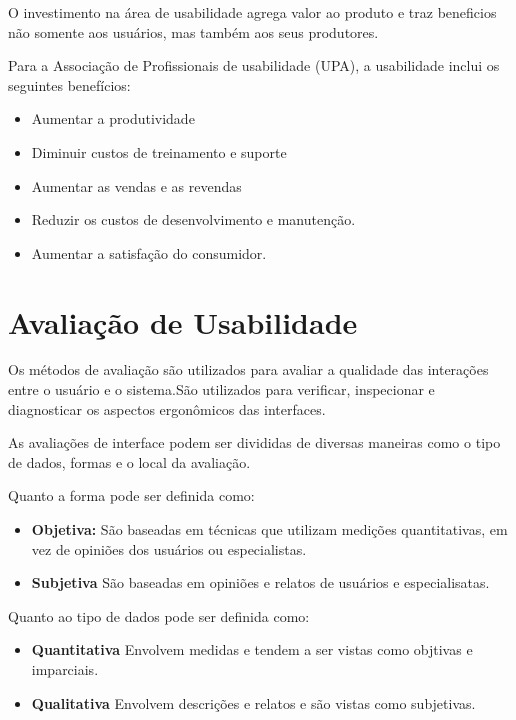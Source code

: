 	O investimento na área de usabilidade agrega valor ao produto e traz beneficios não somente aos usuários, mas também aos seus produtores. 

	Para a Associação de Profissionais de usabilidade (UPA), a usabilidade inclui os seguintes benefícios:

\begin{itemize}
\item Aumentar a produtividade
\item Diminuir custos de treinamento e suporte
\item Aumentar as vendas e as revendas
\item Reduzir os custos de desenvolvimento e manutenção.
\item Aumentar a satisfação do consumidor.
\end{itemize}



\section {Avaliação de Usabilidade}

	
	Os métodos de avaliação são utilizados para avaliar a qualidade das interações entre o usuário e o sistema.São utilizados para verificar, inspecionar e diagnosticar os aspectos ergonômicos das interfaces.

	As avaliações de interface podem ser divididas de diversas maneiras como o tipo de dados, formas e o local da avaliação.

	Quanto a forma pode ser definida como:

	\begin{itemize}
		\item \textbf{Objetiva:} São baseadas em técnicas que utilizam medições quantitativas, em vez de opiniões dos usuários ou especialistas.
		\item \textbf{Subjetiva} São baseadas em opiniões e relatos de usuários e especialisatas.
	\end{itemize}

	Quanto ao tipo de dados pode ser definida como:

	\begin{itemize}
		\item \textbf{Quantitativa} Envolvem medidas e tendem a ser vistas como objtivas e imparciais.
		\item \textbf{Qualitativa} Envolvem descrições e relatos e são vistas como subjetivas.
	\end{itemize}

